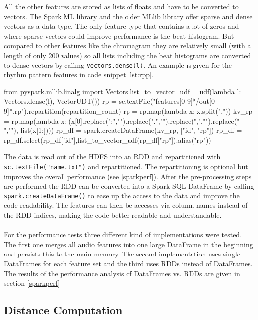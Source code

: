 \noindent All the other features are stored as lists of floats and have to be converted to vectors. The Spark ML library and the older MLlib library offer sparse and dense vectors as a data type. The only feature type that contains a lot of zeros and where sparse vectors could improve performance is the beat histogram. But compared to other features like the chromagram they are relatively small (with a length of only 200 values) so all lists including the beat histograms are converted to dense vectors by calling \lstinline{Vectors.dense(l)}. An example is given for the rhythm pattern features in code snippet \ref{lst:rpp}.

\begin{pythonCode}[frame=single,label={lst:rpp},caption={rp preprocessing},captionpos=b]
from pyspark.mllib.linalg import Vectors
list_to_vector_udf = udf(lambda l: Vectors.dense(l), VectorUDT())
rp = sc.textFile("features[0-9]*/out[0-9]*.rp").repartition(repartition_count)
rp = rp.map(lambda x: x.split(","))
kv_rp = rp.map(lambda x: (x[0].replace(";","").replace(".","").replace(",","").replace(" ",""), list(x[1:])))
rp_df = spark.createDataFrame(kv_rp, ["id", "rp"])
rp_df = rp_df.select(rp_df["id"],list_to_vector_udf(rp_df["rp"]).alias("rp"))
\end{pythonCode}

\noindent The data is read out of the HDFS into an RDD and repartitioned with \lstinline{sc.textFile("name.txt")} and repartitioned. The repartitioning is optional but improves the overall performance (see \ref{sparkperf}). After the pre-processing steps are performed the RDD can be converted into a Spark SQL DataFrame by calling \lstinline{spark.createDataFrame()} to ease up the access to the data and improve the code readability. The features can then be accesses via column names instead of the RDD indices, making the code better readable and understandable.\\\\
For the performance tests three different kind of implementations were tested. The first one merges all audio features into one large DataFrame in the beginning and persists this to the main memory. The second implementation uses single DataFrames for each feature set and the third uses RDDs instead of DataFrames. The results of the performance analysis of DataFrames vs. RDDs are given in section \ref{sparkperf}

\subsection{Distance Computation}

